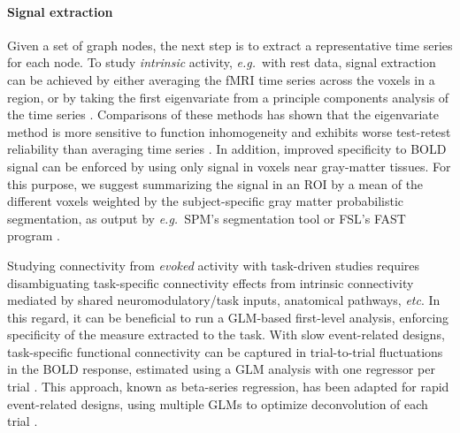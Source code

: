\documentclass[5p]{elsarticle}
\begin{document}
\paragraph{Signal extraction}
%
Given a set of graph nodes, the next step is to extract a representative time
series for each node.  To study \emph{intrinsic} activity, \emph{e.g.}\ with
rest data, signal extraction can be achieved by either averaging the fMRI time
series across the voxels in a region, or by taking the first eigenvariate from a
principle components analysis of the time series \cite{friston2006}.
Comparisons of these methods has shown that the eigenvariate method is
more sensitive to function inhomogeneity \cite{craddock2012} and exhibits worse
test-retest reliability than averaging time series \cite{zuo2010}. 
In addition, improved specificity to BOLD signal can be enforced
by using only signal in voxels near gray-matter tissues. For this purpose, we
suggest summarizing the signal in an ROI by a mean of the different voxels
weighted by the subject-specific gray matter probabilistic segmentation, 
as output by \emph{e.g.}\ SPM's segmentation tool \cite{ashburner2005} or
FSL's FAST program \cite{zhang2001}.

Studying connectivity from \emph{evoked} activity with task-driven studies 
requires disambiguating task-specific connectivity effects from
intrinsic connectivity mediated by shared neuromodulatory/task 
inputs, anatomical pathways, \emph{etc}. In this regard, it
can be beneficial to run a GLM-based first-level analysis, enforcing specificity
of the measure extracted to the task. With slow event-related designs,
task-specific functional connectivity can be captured in trial-to-trial
fluctuations in the BOLD response, estimated using a GLM analysis with one
regressor per trial \cite{grillon2012,rissman2004,mennes2010}. This approach,
known as beta-series regression, has been adapted for rapid event-related
designs, using multiple GLMs to optimize deconvolution of each trial
\cite{mumford2012}.
\end{document}
